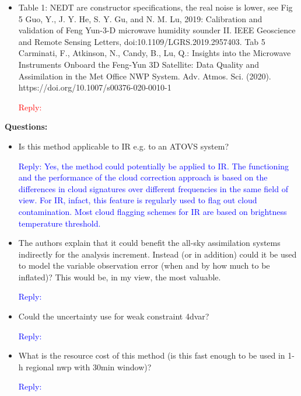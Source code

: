 \documentclass[11pt,a4paper,draft]{article}
\begin{document}
\begin{itemize}
		
		
\item	
		Table 1: NEDT are constructor specifications, the real noise is lower, see
		Fig 5 Guo, Y., J. Y. He, S. Y. Gu, and N. M. Lu, 2019: Calibration and validation of
		Feng Yun-3-D microwave humidity sounder II. IEEE Geoscience and Remote Sensing
		Letters, doi:10.1109/LGRS.2019.2957403.	Tab 5 Carminati, F., Atkinson, N., Candy, B., Lu, Q.: Insights into the Microwave Instruments Onboard the Feng-Yun 3D Satellite: Data Quality and Assimilation in the Met Office NWP System. Adv. Atmos. Sci. (2020). https://doi.org/10.1007/s00376-020-0010-1
	
\textcolor{red}{Reply:  }
		
\end{itemize}

		
		
		\textbf{Questions:}
		\newline
\begin{itemize}
		
\item	
		Is this method applicable to IR e.g. to an ATOVS system?
	
\textcolor{blue}{Reply:  Yes, the method could potentially be applied to IR. The functioning and the performance of the cloud correction approach is based on the differences in cloud signatures over different frequencies in the same field of view. For IR, infact, this feature is regularly used to flag out cloud contamination. Most cloud flagging schemes for IR are based on brightness temperature threshold.
}

\item 		
		The authors explain that it could benefit the all-sky assimilation systems indirectly for
		the analysis increment. Instead (or in addition) could it be used to model the variable
		observation error (when and by how much to be inflated)? This would be, in my view,
		the most valuable.	
			
\textcolor{blue}{Reply: }
		
\item	Could the uncertainty use for weak constraint 4dvar?
		
\textcolor{blue}{Reply:}
		
		
		
\item	
		What is the resource cost of this method (is this fast enough to be used in 1-h regional
		nwp with 30min window)?
	
\textcolor{blue}{Reply:}
		
\end{itemize}		

	
	
\end{document}
